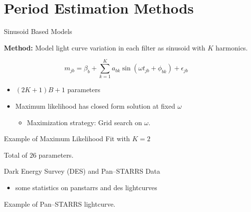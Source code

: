 \documentclass[12pt]{beamer}
\begin{document}





\section{Period Estimation Methods}



\begin{frame}{Sinusoid Based Models}

\textbf{Method:} Model light curve variation in each filter as sinusoid with $K$ harmonics. \cite{mondrik2015multiband,zechmeister2009generalised,lomb1976least,scargle1982studies,schwarzenberg1996fast}

\begin{equation*}
m_{jb} = \beta_b + \sum_{k=1}^K a_{bk}\sin(\omega t_{jb} + \phi_{bk}) + \epsilon_{jb}
\end{equation*}

\begin{itemize}
\item $(2K + 1)B + 1$ parameters
\item Maximum likelihood has closed form solution at fixed $\omega$
\begin{itemize}
\item Maximization strategy: Grid search on $\omega$.
\end{itemize}
\end{itemize}

\end{frame}


\begin{frame}{Example of Maximum Likelihood Fit with $K=2$}

\begin{center}
Total of $26$ parameters.
\end{center}

\end{frame}


\begin{frame}{Dark Energy Survey (DES) and Pan--STARRS Data}

\begin{itemize}
\item some statistics on panstarrs and des lightcurves
\end{itemize}


Example of Pan--STARRS lightcurve.

\end{frame}
\end{document}

